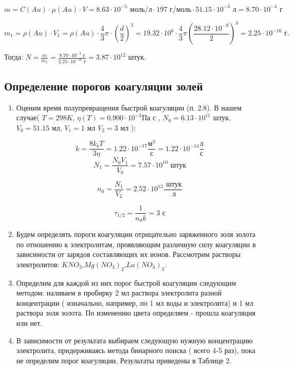\documentclass[a4paper,12pt]{article}
\begin{document}
\[m = C(Au)\cdot \mu(Au)\cdot V = 8.63\cdot10^{-5} \text{ моль/л} \cdot 197 \text{ г/моль} \cdot 51.15\cdot 10^{-3} \text{ л} = 8.70 \cdot 10^{-4}\text{ г}\]

\[m_1=\rho(Au) \cdot V_1 = \rho(Au) \cdot \frac{4}{3} \pi \cdot \left( \frac{d}{2} \right)^3 = 19.32 \cdot 10^{6} \cdot \frac{4}{3} \pi (\frac{28.12\cdot10^{-9}}{2})^3 = 2.25 \cdot 10^{-16}\text{ г}. \]

Тогда:
$N=\frac{m}{m_1} =\frac{8.70 \cdot 10^{-4} \text{ г}}{2.25 \cdot 10^{-16}  \text{ г}} = 3.87 \cdot 10^{12}$ штук.

\subsection{Определение порогов коагуляции золей}
\begin{enumerate}
    \item Оценим время полупревращения быстрой коагуляции (п. 2.8). В нашем случае( $T = 298 K$,  $\eta(T) = 0.900\cdot 10^{-3} \text{Па с}$ \cite{3}, $N_0 = 6.13 \cdot 10^{11} \text{ штук}$, $V_0 = 51.15 \text{ мл}$, $V_1 = 1 \text{ мл} $ $V_2 = 3 \text{ мл} $ ):

    
    \[ k = \frac{8k_{b}T}{3\eta} = 1.22 \cdot 10^{-17} \frac{\text{м}^{3}} {\text{с}} = 1.22 \cdot 10^{-14} \frac{\text{л}} {\text{с}}\]
    \[
N_1 = \frac{N_0 V_1}{V_0} = 7.57 \cdot 10^{10}\text{ штук} 
    \]
    
    \[n_0 = \frac{N_1}{V_2} = 2.52 \cdot 10^{13}\frac{\text{ штук}}{\text{ л}}\]
   
    \[\tau_{1/2} = \frac{1}{n_0 k} = 3 \text{ с}  
    \]
    
    \item Будем определять пороги коагуляции отрицательно заряженного золя золота по отношению к электролитам, проявляющим различную силу коагуляции в зависимости от зарядов составляющих их ионов. Рассмотрим растворы электролитов: $KNO_3$,$Mg(NO_3)_2$,$La(NO_3)_3$.
    \item Определим для каждой из них порог быстрой коагуляции следующим методом: наливаем в пробирку 2 мл раствора электролита разной концентрации ( изначально, например, по 1 мл воды и электролита) и 1 мл раствора золя золота. По изменению цвета определяем - прошла коагуляция или нет.
    \item В зависимости от результата выбираем следующую нужную концентрацию электролита, придерживаясь метода бинарного поиска ( всего 4-5 раз), пока не определим порог коагуляции. Результаты приведены в Таблице 2. 


\end{enumerate}
\end{document}
